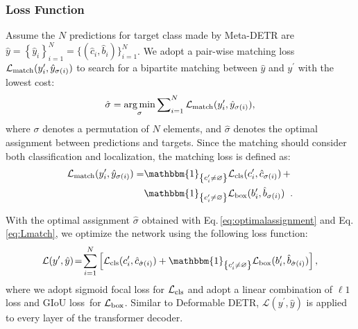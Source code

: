 \documentclass[letterpaper]{article} \usepackage{aaai22}  \usepackage{times}  \usepackage{helvet}  \usepackage{courier}  \usepackage[hyphens]{url}  \usepackage{graphicx} \urlstyle{rm} \def\UrlFont{\rm}  \usepackage{natbib}  \usepackage{caption} \DeclareCaptionStyle{ruled}{labelfont=normalfont,labelsep=colon,strut=off} \frenchspacing  \setlength{\pdfpagewidth}{8.5in}  \setlength{\pdfpageheight}{11in}  \usepackage{algorithm}
\begin{document}
\subsubsection{Loss Function}
Assume the $N$ predictions for target class made by Meta-DETR are $\hat{y} \! = \! \left\{ \hat{y}_i \right\}_{i=1}^{N} \! = \! \big\{ (\hat{c}_{i}, \hat{b}_{i}) \big\}_{i=1}^{N}$. We adopt a pair-wise matching loss $\mathcal{L}_{\rm match}(y^{\prime}_i, \hat{y}_{\sigma(i)})$ to search for a bipartite matching between $\hat{y}$ and $y^{\prime}$ with the lowest cost:
\begin{equation} \label{eq:optimalassignment}
\hat{\sigma} = \mathop{\arg\min}_{\sigma} \sum\nolimits_{i=1}^{N}\mathcal{L}_{\rm match}(y^{\prime}_i, \hat{y}_{\sigma(i)}),
\end{equation}
where $\sigma$ denotes a permutation of $N$ elements, and $\hat{\sigma}$ denotes the optimal assignment between predictions and targets. Since the matching should consider both classification and localization, the matching loss is defined as:
\begin{equation} \label{eq:Lmatch}
\begin{split}
\mathcal{L}_{\rm match}(y^{\prime}_i, \hat{y}_{\sigma(i)}) = &\mathbbm{1}_{\left\{ c^{\prime}_i \neq \varnothing \right\}} \mathcal{L}_{\rm cls}(c^{\prime}_i, \hat{c}_{\sigma(i)}) \, + \\&\mathbbm{1}_{\left\{ c^{\prime}_i \neq \varnothing \right\}} \mathcal{L}_{\rm box}(b^{\prime}_i, \hat{b}_{\sigma(i)}) \;\;.
\end{split}
\end{equation}

With the optimal assignment $\hat{\sigma}$ obtained with Eq.\,\ref{eq:optimalassignment} and Eq.\,\ref{eq:Lmatch}, we optimize the network using the following loss function:
\begin{equation} \label{eq:L}
\begin{split}
\mathcal{L}(y^{\prime}, \hat{y}) \! = \! \sum\limits_{i=1}^{N} \left[ \mathcal{L}_{\rm cls}(c^{\prime}_i, \hat{c}_{\hat{\sigma}(i)}) + \mathbbm{1}_{\left\{ c^{\prime}_i \neq \varnothing \right\}} \mathcal{L}_{\rm box}(b^{\prime}_i, \hat{b}_{\hat{\sigma}(i)}) \right],
\end{split}
\end{equation}
where we adopt sigmoid focal loss\;\cite{focalloss} for $\mathcal{L}_{\rm cls}$ and adopt a linear combination of $\ell1$ loss and GIoU loss\,\cite{giouloss} for $\mathcal{L}_{\rm box}$. Similar to Deformable DETR\;\cite{DeformableDETR}, $\mathcal{L}(y^{\prime}, \hat{y})$ is applied to every layer of the transformer decoder.
\end{document}
